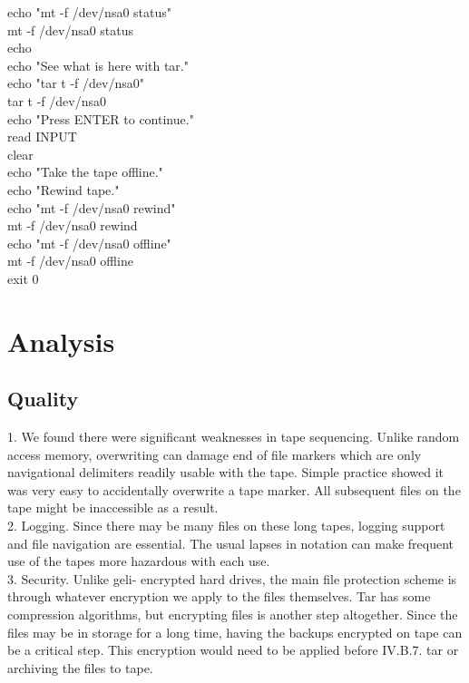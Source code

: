 {echo "mt -f /dev/nsa0 status"\\
mt -f /dev/nsa0 status\\
echo\\
echo "See what is here with tar."\\
echo "tar t -f /dev/nsa0"\\
tar t -f /dev/nsa0\\
echo "Press ENTER to continue."\\
read INPUT\\
clear\\
echo "Take the tape offline."\\
echo "Rewind tape."\\
echo "mt -f /dev/nsa0 rewind"\\
mt -f /dev/nsa0 rewind\\
echo "mt -f /dev/nsa0 offline"\\
mt -f /dev/nsa0 offline\\
exit 0\\}

\section{Analysis}
\subsection{Quality}
1.  We found there were significant weaknesses in tape sequencing.  Unlike random access memory, overwriting can damage end of file markers which are only navigational delimiters readily usable with the tape.  Simple practice showed it was very easy to accidentally overwrite a tape marker.  All subsequent files on the tape might be inaccessible as a result.\\

2.  Logging.  Since there may be many files on these long tapes, logging support and file navigation are essential.  The usual lapses in notation can make frequent use of the tapes more hazardous with each use.\\

3.  Security.  Unlike geli- \gls{encrypt}ed hard drives, the main file protection scheme is through whatever   \gls{encrypt}ion we apply to the files themselves.  Tar has some compression algorithms, but   \gls{encrypt}ing files is another step altogether.  Since the files may be in storage for a long time, having the backups   \gls{encrypt}ed on tape can be a critical step.  This   \gls{encrypt}ion would need to be applied before IV.B.7. tar or archiving the files to tape.

